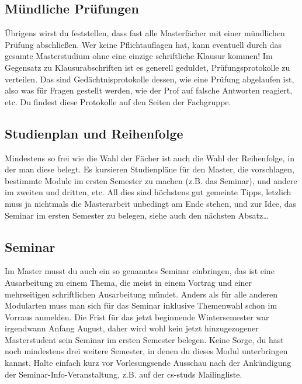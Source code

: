 \subsection{Mündliche Prüfungen}
Übrigens wirst du feststellen, dass fast alle Masterfächer mit einer mündlichen Prüfung abschließen. Wer keine Pflichtauflagen hat, kann eventuell durch das gesamte Masterstudium ohne eine einzige schriftliche Klausur kommen! Im Gegensatz zu Klausurabschriften ist es generell geduldet, Prüfungsprotokolle zu verteilen. Das sind Gedächtnisprotokolle dessen, wie eine Prüfung abgelaufen ist, also was für Fragen gestellt werden, wie der Prof auf falsche Antworten reagiert, etc. Du findest diese Protokolle auf den Seiten der Fachgruppe.

\subsection{Studienplan und Reihenfolge}
Mindestens so frei wie die Wahl der Fächer ist auch die Wahl der Reihenfolge, in der man diese belegt. Es kursieren Studienpläne für den Master, die vorschlagen, bestimmte Module im ersten Semester zu machen (z.B. das Seminar), und andere im zweiten und dritten, etc. All dies sind höchstens gut gemeinte Tipps, letzlich muss ja nichtmals die Masterarbeit unbedingt am Ende stehen, und zur Idee, das Seminar im ersten Semester zu belegen, siehe auch den nächsten Absatz\ldots

\subsection{Seminar}
Im Master musst du auch ein so genanntes Seminar einbringen, das ist eine Ausarbeitung zu einem Thema, die meist in einem Vortrag und einer mehrseitigen schriftlichen Ausarbeitung mündet. Anders als für alle anderen Modularten muss man sich für das Seminar inklusive Themenwahl schon im Vorraus anmelden. Die Frist für das jetzt beginnende Wintersemester war irgendwann Anfang August, daher wird wohl kein jetzt hinzugezogener Masterstudent sein Seminar im ersten Semester belegen. Keine Sorge, du hast noch mindestens drei weitere Semester, in denen du dieses Modul unterbringen kannst. Halte einfach kurz vor Vorlesungsende Ausschau nach der Ankündigung der Seminar-Info-Veranstaltung, z.B. auf der cs-studs Mailingliste.

